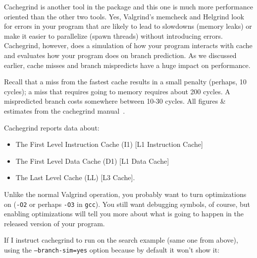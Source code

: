 Cachegrind is another tool in the package and this one is much more performance oriented than the other two tools. Yes, Valgrind's memcheck and Helgrind look for errors in your program that are likely to lead to slowdowns (memory leaks) or make it easier to parallelize (spawn threads) without introducing errors. Cachegrind, however, does a simulation of how your program interacts with cache and evaluates how your program does on branch prediction. As we discussed earlier, cache misses and branch mispredicts have a huge impact on performance.

Recall that a miss from the fastest cache results in a small penalty (perhaps, 10 cycles); a miss that requires going to memory requires about 200 cycles. A mispredicted branch costs somewhere between 10-30 cycles. All figures \& estimates from the cachegrind manual~\cite{cachegrind}.

Cachegrind reports data about:
\begin{itemize}
	\item The First Level Instruction Cache (I1) [L1 Instruction Cache]
	\item The First Level Data Cache (D1) [L1 Data Cache]
	\item The Last Level Cache (LL) [L3 Cache].
\end{itemize}

Unlike the normal Valgrind operation, you probably want to turn optimizations on (\texttt{-O2} or perhaps \texttt{-O3} in \texttt{gcc}). You still want debugging symbols, of course, but enabling optimizations will tell you more about what is going to happen in the released version of your program.

If I instruct cachegrind to run on the search example (same one from above), using the \texttt{--branch-sim=yes} option because by default it won't show it:

